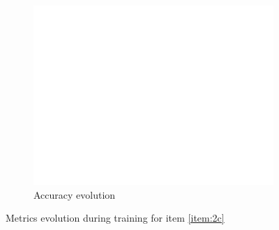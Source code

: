 \documentclass[10pt, a4paper]{article}
\begin{document}
\begin{figure}[htpb]
\begin{subfigure}[b]{0.32\textwidth}
      \centering
      \includegraphics[width=\textwidth]{images/Patch128_scratch_acc.pdf}
      \caption{Accuracy evolution}
      \label{fig:q2c_acc}
  \end{subfigure}
  \caption{Metrics evolution during training for item \ref{item:2c}}
  \label{fig:q2c_metrics}
\end{figure}
\end{document}
